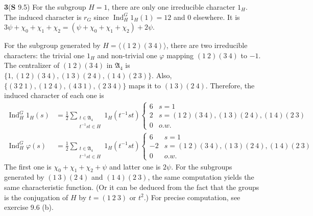 \documentclass[a4paper, 12pt]{article}
\theoremstyle{Mydefinition}
\theoremstyle{Mytheorem}
\DeclareMathOperator{\Ind}{Ind}
\begin{document}
\noindent \textbf{3}(\textbf{S} 9.5)
For the subgroup $H=1$, there are only one irreducible character $1_H$. The induced character is $r_G$ since $\Ind_H^G 1_H(1)=12$ and $0$ elsewhere. It is $3\psi + \chi_0+\chi_1+\chi_2 =(\psi + \chi_0+\chi_1+\chi_2)+2\psi$.

For the subgroup generated by $H=\langle (1~2)(3~4)\rangle $, there are two irreducible characters: the trivial one $1_H$ and non-trivial one $\varphi$ mapping $(1~2)(3~4)$ to $-1$. The centralizer of $(1~2)(3~4)$ in $\mathfrak{A}_4$ is $\{1, (1~2)(3~4),(1~3)(2~4),(1~4)(2~3)\}$. Also, $\{(3~2~1), (1~2~4), (4~3~1), (2~3~4)\}$ maps it to $(1~3)(2~4)$. Therefore, the induced character of each one is
\begin{equation}
\begin{split}
    \Ind_H^G 1_H(s) &=\frac{1}{2}\sum_{\substack{t\in \mathfrak{A}_4\\t^{-1}st\in H}} 1_H(t^{-1}st)\begin{cases}
    6 & s=1\\
    2 & s=(1~2)(3~4), (1~3)(2~4), (1~4)(2~3)\\
    0 & o.w.
    \end{cases}\\
    \Ind_H^G \varphi(s) &=\frac{1}{2}\sum_{\substack{t\in \mathfrak{A}_4\\t^{-1}st\in H}} 1_H(t^{-1}st)\begin{cases}
    6 & s=1\\
    -2 & s=(1~2)(3~4), (1~3)(2~4), (1~4)(2~3)\\
    0 & o.w.
    \end{cases}
\end{split}
\end{equation}
The first one is $\chi_0+\chi_1+\chi_2+\psi$ and latter one is $2\psi$. For the subgroups generated by $(1~3)(2~4)$ and $(1~4)(2~3)$, the same computation yields the same characteristic function. (Or it can be deduced from the fact that the groups is the conjugation of $H$ by $t=(1~2~3)$ or $t^2$.) For precise computation, see exercise 9.6 (b).
\end{document}

